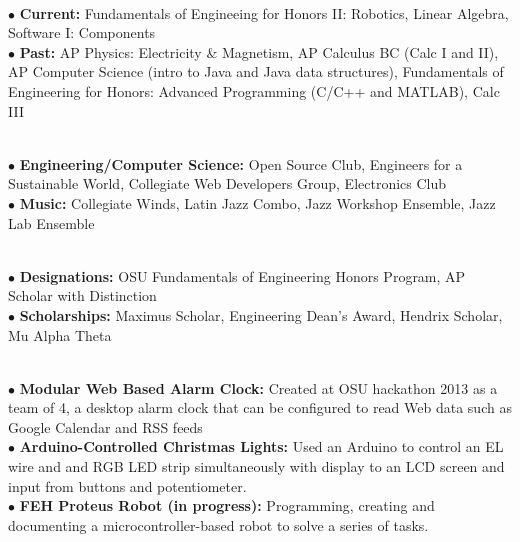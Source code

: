 \documentclass[10pt]{article}
\begin{document}
\\
\smallskip
$\bullet$ {\bf Current:} Fundamentals of Engineeing for Honors II: Robotics, Linear Algebra, Software I: Components\\
$\bullet$ {\bf Past:} AP Physics: Electricity \& Magnetism, AP Calculus BC (Calc I and II), AP Computer Science (intro to Java and Java data structures), Fundamentals of Engineering for Honors: Advanced Programming (C/C++ and MATLAB), Calc III
\medskip

\\
\smallskip
$\bullet$ {\bf Engineering/Computer Science:} Open Source Club, Engineers for a Sustainable World, Collegiate Web Developers Group, Electronics Club\\
$\bullet$ {\bf Music:} Collegiate Winds, Latin Jazz Combo, Jazz Workshop Ensemble, Jazz Lab Ensemble
\medskip

\\
\smallskip
$\bullet$ {\bf Designations:} OSU Fundamentals of Engineering Honors Program, AP Scholar with Distinction\\
$\bullet$ {\bf Scholarships:} Maximus Scholar, Engineering Dean's Award, Hendrix Scholar, Mu Alpha Theta
\medskip

\\
\smallskip
$\bullet$ {\bf Modular Web Based Alarm Clock:} Created at OSU hackathon 2013 as a team of 4, a desktop alarm clock that can be configured to read Web data such as Google Calendar and RSS feeds\\
$\bullet$ {\bf Arduino-Controlled Christmas Lights:} Used an Arduino to control an EL wire and and RGB LED strip simultaneously with display to an LCD screen and input from buttons and potentiometer.\\
$\bullet$ {\bf FEH Proteus Robot (in progress):} Programming, creating and documenting a microcontroller-based robot to solve a series of tasks.
\medskip
\end{document}
